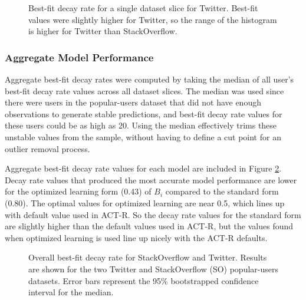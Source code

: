 \documentclass[man,floatsintext,donotrepeattitle]{apa6}
\begin{document}
\begin{figure}[!htbp]
  {%
    \setlength{\fboxsep}{0pt}%
    \setlength{\fboxrule}{1pt}%
    \hfill
    \hfill
    \caption{
      Best-fit decay rate for a single dataset slice for Twitter.
      Best-fit values were slightly higher for Twitter, so the range of the histogram is higher for Twitter than StackOverflow.
  }
    \label{figPriorTwitterHistDsOL}
  }%
\end{figure}

\subsubsection{Aggregate Model Performance}

Aggregate best-fit decay rates were computed by taking the median of all user's best-fit decay rate values across all dataset slices.
The median was used since there were users in the popular-users dataset that did not have enough observations to generate stable predictions, and best-fit decay rate values for these users could be as high as 20.
Using the median effectively trims these unstable values from the sample, without having to define a cut point for an outlier removal process.

Aggregate best-fit decay rate values for each model are included in Figure \ref{figPriorDecay}.
Decay rate values that produced the most accurate model performance are lower for the optimized learning form (\num{.43}) of $B_{i}$ compared to the standard form (\num{.80}).
The optimal values for optimized learning are near \num{0.5}, which lines up with default value used in ACT-R.
So the decay rate values for the standard form are slightly higher than the default values used in ACT-R, but the values found when optimized learning is used line up nicely with the ACT-R defaults.

\begin{figure}[!htbp]
  \caption{
  Overall best-fit decay rate for StackOverflow and Twitter.
  Results are shown for the two Twitter and StackOverflow (SO) popular-users datasets.
  Error bars represent the 95\% bootstrapped confidence interval for the median.
}
  \label{figPriorDecay}
\end{figure}
\end{document}
